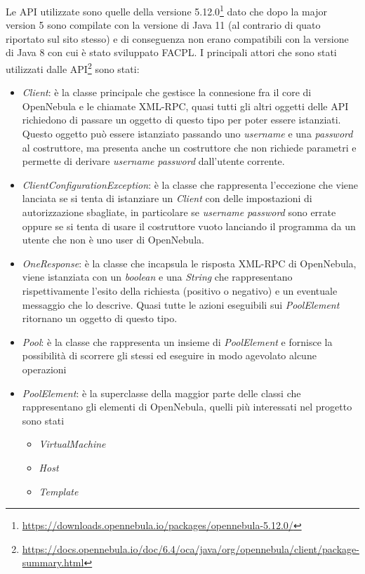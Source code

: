 Le API utilizzate sono quelle della versione 5.12.0\footnote{\url{https://downloads.opennebula.io/packages/opennebula-5.12.0/}} dato che dopo la major version 5 sono compilate con la versione di Java 11 (al contrario di quato riportato sul sito stesso) e di conseguenza non erano compatibili con la versione di Java 8 con cui è stato sviluppato FACPL.
I principali attori che sono stati utilizzati dalle API\footnote{\url{https://docs.opennebula.io/doc/6.4/oca/java/org/opennebula/client/package-summary.html}} sono stati:
\begin{itemize}
    \item \emph{Client}: è la classe principale che gestisce la connesione fra il core di OpenNebula e le chiamate XML-RPC, quasi tutti gli altri oggetti delle API richiedono di passare un oggetto di questo tipo per poter essere istanziati. Questo oggetto può essere istanziato passando uno \emph{username} e una \emph{password} al costruttore, ma presenta anche un costruttore che non richiede parametri e permette di derivare \emph{username} \emph{password} dall'utente corrente.
    \item \emph{ClientConfigurationException}: è la classe che rappresenta l'eccezione che viene lanciata se si tenta di istanziare un \emph{Client} con delle impostazioni di autorizzazione sbagliate, in particolare se \emph{username} \emph{password} sono errate oppure se si tenta di usare il costruttore vuoto lanciando il programma da un utente che non è uno user di OpenNebula.
    \item \emph{OneResponse}: è la classe che incapsula le risposta XML-RPC di OpenNebula, viene istanziata con un \emph{boolean} e una \emph{String} che rappresentano rispettivamente l'esito della richiesta (positivo o negativo) e un eventuale messaggio che lo descrive. Quasi tutte le azioni eseguibili sui \emph{PoolElement} ritornano un oggetto di questo tipo.
    \item \emph{Pool}: è la classe che rappresenta un insieme di \emph{PoolElement} e fornisce la possibilità di scorrere gli stessi ed eseguire in modo agevolato alcune operazioni
    \item \emph{PoolElement}: è la superclasse della maggior parte delle classi che rappresentano gli elementi di OpenNebula, quelli più interessati nel progetto sono stati
    \begin{itemize}
        \item \emph{VirtualMachine}
        \item \emph{Host}
        \item \emph{Template}
    \end{itemize}
\end{itemize}

